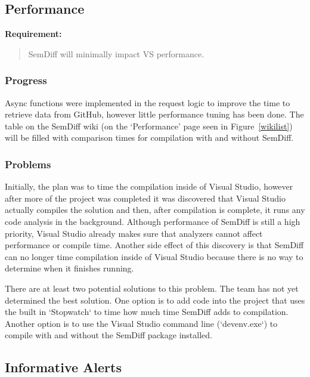 \documentclass[draftclsnofoot,onecolumn]{IEEEtran}
\begin{document}
\subsection{Performance}

\textbf{Requirement:}

\begin{quote}

SemDiff will minimally impact VS performance.

\end{quote}

\subsubsection{Progress}

Async functions were implemented in the request logic to improve the time to 
retrieve data from GitHub, however little performance tuning has been done. 
The table on the SemDiff wiki (on the ‘Performance’ page seen in 
Figure~\ref{wikilist}) will be filled with comparison times for compilation 
with and without SemDiff. 

\subsubsection{Problems}

Initially, the plan was to time the compilation inside of Visual Studio, 
however after more of the project was completed it was discovered that 
Visual Studio actually compiles the solution and then, after compilation is 
complete, it runs any code analysis in the background. Although performance 
of SemDiff is still a high priority, Visual Studio already makes sure that 
analyzers cannot affect performance or compile time. Another side effect of 
this discovery is that SemDiff can no longer time compilation inside of 
Visual Studio because there is no way to determine when it finishes running.
 
There are at least two potential solutions to this problem. The team has not 
yet determined the best solution. One option is to add code into the project 
that uses the built in `Stopwatch` to time how much time SemDiff adds to 
compilation. Another option is to use the Visual Studio command line 
(`devenv.exe`) to compile with and without the SemDiff package installed.





\subsection{Informative Alerts}
\end{document}
